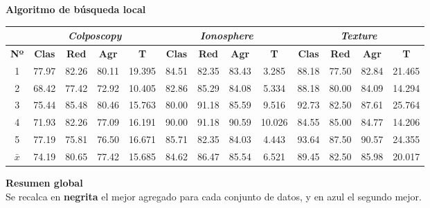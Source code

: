 \documentclass[12pt]{article}
\begin{document}
{\color{red}\textbf{Algoritmo de búsqueda local}}

\begin{table}[ht!]
\begin{tabular}{ccccc|cccc|cccc}
\centering
 & \multicolumn{4}{c}{\textit{Colposcopy}} & \multicolumn{4}{c}{\textit{Ionosphere}} & \multicolumn{4}{c}{\textit{Texture}} \\ \hline
\textbf{Nº} & \textbf{Clas} & \textbf{Red} & \textbf{Agr} & \textbf{T} & \textbf{Clas} & \textbf{Red} & \textbf{Agr} & \textbf{T} & \textbf{Clas} & \textbf{Red} & \textbf{Agr} & \textbf{T} \\ \hline
1 & 77.97 & 82.26 & 80.11 & 19.395 & 84.51 & 82.35 & 83.43 & 3.285 & 88.18 & 77.50 & 82.84 & 21.465\\
2 & 68.42 & 77.42 & 72.92 & 10.405 & 82.86 & 85.29 & 84.08 & 5.334 & 88.18 & 80.00 & 84.09 & 14.294\\
3 & 75.44 & 85.48 & 80.46 & 15.763 & 80.00 & 91.18 & 85.59 & 9.516 & 92.73 & 82.50 & 87.61 & 25.764\\
4 & 71.93 & 82.26 & 77.09 & 16.191 & 90.00 & 91.18 & 90.59 & 10.026 & 84.55 & 85.00 & 84.77 & 14.206\\
5 & 77.19 & 75.81 & 76.50 & 16.671 & 85.71 & 82.35 & 84.03 & 4.443 & 93.64 & 87.50 & 90.57 & 24.355\\
\hline
$\bar{x}$  & 74.19 & 80.65 & 77.42 & 15.685 & 84.62 & 86.47 & 85.54 & 6.521 & 89.45 & 82.50 & 85.98 & 20.017
\end{tabular}
\end{table}

\textbf{Resumen global}\\

Se recalca en \textbf{negrita} el mejor agregado para cada conjunto de datos, y en {\color{blue} azul} el segundo mejor.
\end{document}
